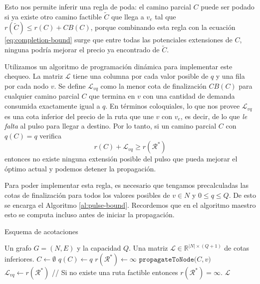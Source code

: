 Esto nos permite inferir una regla de poda: el camino parcial $C$ puede ser podado si ya existe otro camino factible $\tilde{C}$ que llega a $v_e$ tal que $r(\tilde{C}) \leq r(C) + CB(C)$, porque combinando esta regla con la ecuación \ref{eq:completion-bound} surge que entre todas las potenciales extensiones de $C$, ninguna podría mejorar el precio ya encontrado de $\tilde{C}$.

Utilizamos un algoritmo de programación dinámica para implementar este chequeo. La matriz $\mathscr{L}$ tiene una columna por cada valor posible de $q$ y una fila por cada nodo $v$. Se define $\mathscr{L}_{vq}$ como la menor cota de finalización $CB(C)$ para cualquier camino parcial $C$ que termina en $v$ con una cantidad de demanda consumida exactamente igual a $q$. En términos coloquiales, lo que nos provee $\mathscr{L}_{vq}$ es una cota inferior del precio de la ruta que une $v$ con $v_e$, es decir, de lo que \emph{le falta} al pulso para llegar a destino. Por lo tanto, si un camino parcial $C$ con $q(C) = q$ verifica
\begin{equation}
\label{eq:completion-bound-check}
    r(C) + \mathscr{L}_{vq} \geq r(\mathscr{R}^{*})
\end{equation}
entonces no existe ninguna extensión posible del pulso que pueda mejorar el óptimo actual y podemos detener la propagación.

Para poder implementar esta regla, es necesario que tengamos precalculadas las cotas de finalización para todos los valores posibles de $v \in N$ y $0 \leq q \leq Q$. De esto se encarga el Algoritmo \ref{al:pulse-bound}. Recordemos que en el algoritmo maestro esto se computa incluso antes de iniciar la propagación.

\begin{algorithm}[H]
  \caption{Esquema de acotaciones}
  \label{al:pulse-bound}
  \begin{algorithmic}[1]
  	\Require Un grafo $G=(N, E)$ y la capacidad $Q$.
  	\Ensure Una matriz $\mathscr{L} \in \mathbb{R}^{|N| \times (Q+1)}$ de cotas inferiores.
                \State $C \gets \emptyset$ 
                \State $q(C) \gets q$
                \State $r(\mathscr{R}^{*}) \gets \infty$
                \State $\texttt{propagateToNode(}C, v \texttt{)}$
                \State $\mathscr{L}_{vq} \gets r(\mathscr{R}^{*})$ // Si no existe una ruta factible entonces $r(\mathscr{R}^{*}) = \infty$.
            \EndFor
        \EndFor
        \Return $\mathscr{L}$
  \end{algorithmic}
\end{algorithm}

